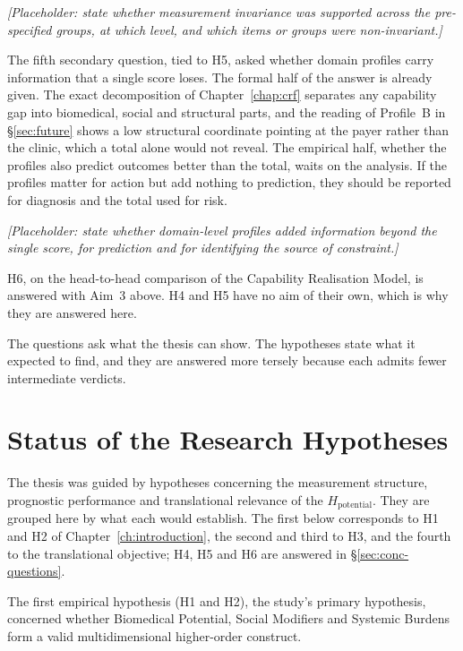 \medskip
\noindent\emph{[Placeholder: state whether measurement invariance was supported across the pre-specified groups, at which level, and which items or groups were non-invariant.]}

The fifth secondary question, tied to H5, asked whether domain profiles carry
information that a single score loses. The formal half of the answer is already
given. The exact decomposition of Chapter~\ref{chap:crf} separates any
capability gap into biomedical, social and structural parts, and the reading of
Profile~B in \S\ref{sec:future} shows a low structural coordinate pointing at the
payer rather than the clinic, which a total alone would not reveal. The empirical half, whether the profiles also predict outcomes
better than the total, waits on the analysis. If the profiles matter for action but add
nothing to prediction, they should be reported for diagnosis and the total used
for risk.

\medskip
\noindent\emph{[Placeholder: state whether domain-level profiles added information beyond the single score, for prediction and for identifying the source of constraint.]}

H6, on the head-to-head comparison of the Capability Realisation Model, is
answered with Aim~3 above. H4 and H5 have no aim of their own, which is why they
are answered here.

The questions ask what the thesis can show. The hypotheses state what it
expected to find, and they are answered more tersely because each admits fewer
intermediate verdicts.

\section{Status of the Research Hypotheses}
\label{sec:hypotheses}

\noindent The thesis was guided by hypotheses concerning the measurement structure, prognostic performance and translational relevance of the $H_{\text{potential}}$. They are grouped here by what each would establish. The first below corresponds to H1 and H2 of Chapter~\ref{ch:introduction}, the second and third to H3, and the fourth to the translational objective; H4, H5 and H6 are answered in \S\ref{sec:conc-questions}.

The first empirical hypothesis (H1 and H2), the study's primary hypothesis, concerned whether Biomedical Potential, Social Modifiers and Systemic Burdens form a valid multidimensional higher-order construct.

